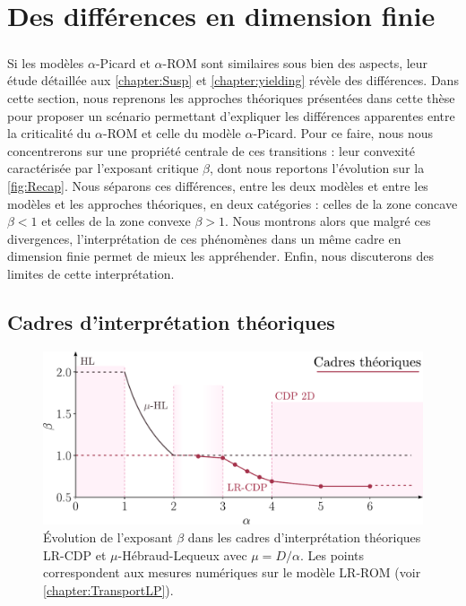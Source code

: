 \newpage

\section{Des différences en dimension finie}

\subparagraph{}Si les modèles $\alpha$-Picard et $\alpha$-ROM sont similaires sous bien des aspects, leur étude détaillée aux \autoref{chapter:Susp} et \autoref{chapter:yielding} révèle des différences. Dans cette section, nous reprenons les approches théoriques présentées dans cette thèse pour proposer un scénario permettant d'expliquer les différences apparentes entre la criticalité du $\alpha$-ROM et celle du modèle $\alpha$-Picard. Pour ce faire, nous nous concentrerons sur une propriété centrale de ces transitions : leur convexité caractérisée par l'exposant critique $\beta$, dont nous reportons l'évolution sur la \autoref{fig:Recap}. Nous séparons ces différences, entre les deux modèles et entre les modèles et les approches théoriques, en deux catégories : celles de la zone concave $\beta < 1$ et celles de la zone convexe $\beta > 1$. Nous montrons alors que malgré ces divergences, l'interprétation de ces phénomènes dans un même cadre en dimension finie permet de mieux les appréhender. Enfin, nous discuterons des limites de cette interprétation.

\label{sec:Diff}

\subsection{Cadres d'interprétation théoriques}

\begin{figure}[h]
	\centering
	\includegraphics[width=\textwidth]{Chapitre5/Figures/RecapTheory.pdf}
	\caption{Évolution de l'exposant $\beta$ dans les cadres d'interprétation théoriques LR-CDP et $\mu$-Hébraud-Lequeux avec $\mu = D/\alpha$. Les points correspondent aux mesures numériques sur le modèle LR-ROM (voir \autoref{chapter:TransportLP}).}
	\label{fig:RecapTheory}
\end{figure}

